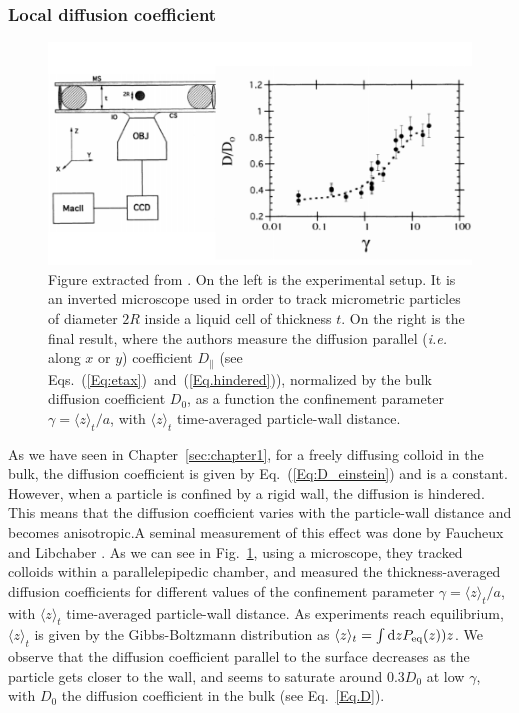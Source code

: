 \newpage

\subsubsection{Local diffusion coefficient}
\label{sec:diff}
\begin{figure}
	\centering
	\includegraphics{02_body/chapter1/image/libchaber.pdf}
	\caption{Figure extracted from \cite{faucheux_confined_1994}. On the left is the experimental setup. It is an inverted microscope used in order to track micrometric particles of diameter $2R$ inside a liquid cell of thickness $t$. On the right is the final result, where the authors measure the diffusion parallel (\textit{i.e.} along $x$ or $y$) coefficient $D_\parallel$ (see Eqs.~(\ref{Eq:etax})~and~(\ref{Eq.hindered})), normalized by the bulk diffusion coefficient $D_0$, as a function the confinement parameter $\gamma = \langle z \rangle_t/a$, with $\langle z \rangle_t$ time-averaged particle-wall distance.}
	\label{fig:libchaber}
\end{figure}


As we have seen in Chapter~\ref{sec:chapter1}, for a freely diffusing colloid in the bulk, the diffusion coefficient is given by Eq.~(\ref{Eq:D_einstein}) and is a constant. However, when a particle is confined by a rigid wall, the diffusion is hindered. This means that the diffusion coefficient varies with the particle-wall distance and becomes anisotropic.A seminal measurement of this effect was done by Faucheux and Libchaber \cite{faucheux_confined_1994}. As we can see in Fig.~\ref{fig:libchaber}, using a microscope, they tracked colloids within a parallelepipedic chamber, and measured the thickness-averaged diffusion coefficients for different values of the confinement parameter $\gamma = \langle z\rangle_t / a$, with $\langle z \rangle_t$ time-averaged particle-wall distance. As experiments reach equilibrium, $\langle z \rangle_t$ is given by the Gibbs-Boltzmann distribution as $\langle z \rangle_t = \int \textnormal{d}zP_\mathrm{eq}(z))z$. We observe that the diffusion coefficient parallel to the surface decreases as the particle gets closer to the wall, and seems to saturate around $0.3D_0$ at low $\gamma$, with $D_0$ the diffusion coefficient in the bulk (see Eq.~\ref{Eq.D}). 
\newpage

